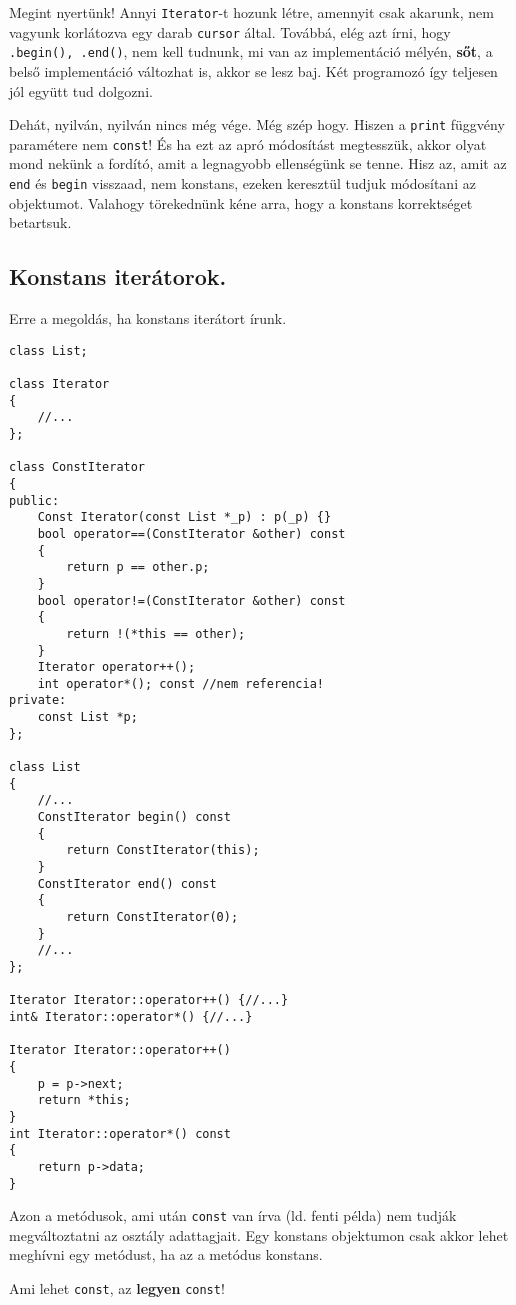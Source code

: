 \documentclass[a4paper,11.5pt]{article}
\begin{document}
	\medskip
	Megint nyertünk! Annyi \texttt{Iterator}-t hozunk létre, amennyit csak akarunk, nem vagyunk korlátozva egy darab \texttt{cursor} által. Továbbá, elég azt írni, hogy \texttt{.begin(), .end()}, nem kell tudnunk, mi van az implementáció mélyén, \textbf{sőt}, a belső implementáció változhat is, akkor se lesz baj. Két programozó így teljesen jól együtt tud dolgozni.
	
	\medskip
	Dehát, nyilván, nyilván nincs még vége. Még szép hogy. Hiszen a \texttt{print} függvény paramétere nem \texttt{const}! És ha ezt az apró módosítást megtesszük, akkor olyat mond nekünk a fordító, amit a legnagyobb ellenségünk se tenne. Hisz az, amit az \texttt{end} és \texttt{begin} visszaad, nem konstans, ezeken keresztül tudjuk módosítani az objektumot. Valahogy törekednünk kéne arra, hogy a konstans korrektséget betartsuk.
	\subsection{Konstans iterátorok.}
	Erre a megoldás, ha konstans iterátort írunk.
\begin{lstlisting}
class List;

class Iterator
{
	//...
};

class ConstIterator
{
public:
	Const Iterator(const List *_p) : p(_p) {}
	bool operator==(ConstIterator &other) const
	{
		return p == other.p;
	}
	bool operator!=(ConstIterator &other) const
	{
		return !(*this == other);
	}
	Iterator operator++();
	int operator*(); const //nem referencia!
private:
	const List *p;
};

class List
{
	//...
	ConstIterator begin() const
	{
		return ConstIterator(this);	
	}
	ConstIterator end() const
	{
		return ConstIterator(0);	
	}
	//...
};

Iterator Iterator::operator++() {//...}
int& Iterator::operator*() {//...}

Iterator Iterator::operator++()
{
	p = p->next;
	return *this;
}
int Iterator::operator*() const
{
	return p->data;
}
\end{lstlisting}
	Azon a metódusok, ami után \texttt{const} van írva (ld. fenti példa) nem tudják megváltoztatni az osztály adattagjait. Egy konstans objektumon csak akkor lehet meghívni egy metódust, ha az a metódus konstans.
	\begin{note}
		Ami lehet \texttt{const}, az \textbf{legyen} \texttt{const}!
	\end{note}
\end{document}
